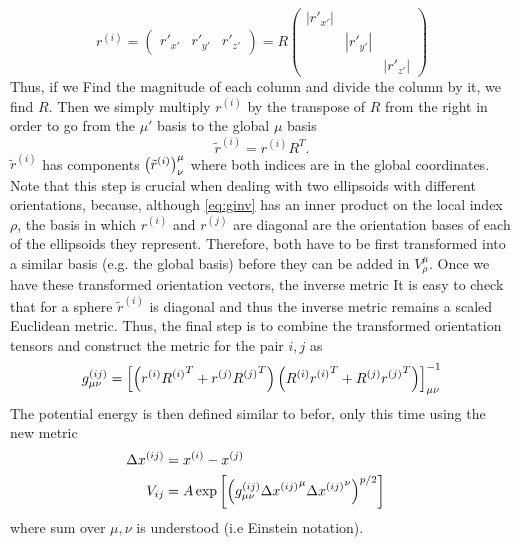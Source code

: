 \documentclass[nofootinbib,preprint,floatfix,titlepage,endfloats,superscriptaddress]{revtex4} %
\begin{document}
\begin{equation}
    r^{(i)} = \left(\begin{array}{c|c|c}r'_{x'} & r'_{y'} &r'_{z'}\end{array}
    \right) = R \begin{pmatrix}
    |r'_{x'}| \\ 
    & |r'_{y'}|\\ 
    & &|r'_{z'}|
    \end{pmatrix}
\end{equation}
Thus, if we Find the magnitude of each column and divide the column by it, we find $R$. 
Then we simply multiply $r^{(i)}$ by the transpose of $R$ from the right in order to go from the $\mu'$ basis to the global $\mu$ basis 
\[\tilde{r}^{(i)} = r^{(i)}R^T. \]
$\tilde{r}^{(i)}$ has components $\left({\tilde{r}^{(i)}}\right)^\mu_\nu$ where both indices are in the global coordinates.
Note that this step is crucial when dealing with two ellipsoids with different orientations, because, although \eqref{eq:ginv} has an inner product on the local index $\rho$, the basis in which $r^{(i)}$ and $r^{(j)}$ are diagonal are the orientation bases of each of the ellipsoids they represent. 
Therefore, both have to be first transformed into a similar basis (e.g. the global basis) before they can be added in $V^{\mu}_\rho$. 
Once we have these transformed orientation vectors, the inverse metric 
It is easy to check that for a sphere $\tilde{r}^{(i)}$ is diagonal and thus the inverse metric remains a scaled Euclidean metric. 
Thus, the final step is to combine the transformed orientation tensors and construct the metric for the pair $i,j$ as 
\begin{equation}
    g_{\mu\nu}^{(ij)} = \left[\left(r^{(i)}{R^{(i)}}^T+ r^{(j)}{R^{(j)}}^T\right) \left(R^{(i)}{r^{(i)}}^T+ R^{(j)}{r^{(j)}}^T\right) \right]^{-1}_{\mu\nu}
\end{equation}
The potential energy is then defined similar to befor, only this time using the new metric 
\begin{align}
    \Delta {x^{(ij)}} &= x^{(i)} - x^{(j)}\cr
    V_{ij} &= A\exp\left[\left(
    g_{\mu\nu}^{(ij)} \Delta {x^{(ij)}}^\mu \Delta {x^{(ij)}}^\nu \right)^{p/2}   \right]
    \label{eq:Vij-ell}
\end{align}
where sum over $\mu,\nu$ is understood (i.e Einstein notation).
\end{document}

